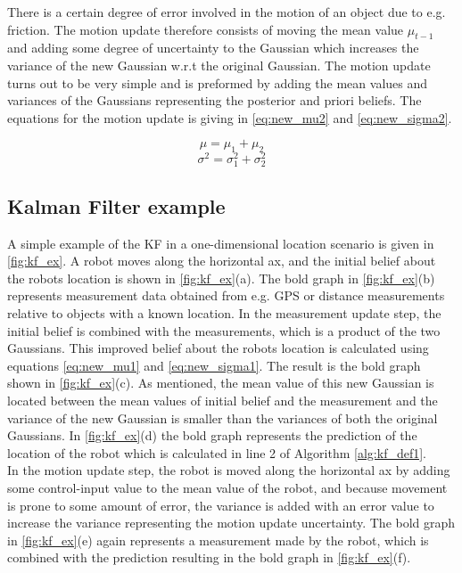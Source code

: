 There is a certain degree of error involved in the motion of an object due to e.g. friction. The motion update therefore consists of moving the mean value $\mu_{t-1}$ and adding some degree of uncertainty to the Gaussian which increases the variance of the new Gaussian w.r.t the original Gaussian. The motion update turns out to be very simple and is preformed by adding the mean values and variances of the Gaussians representing the posterior and priori beliefs. The equations for the motion update is giving in \ref{eq:new_mu2} and \ref{eq:new_sigma2}.

\begin{equation}
\label{eq:new_mu2}
\mu = \mu_{1} + \mu_{2}
\end{equation}
\begin{equation}
\label{eq:new_sigma2}
\sigma^2 = \sigma_{1}^2 + \sigma_{2}^2
\end{equation}

\subsection{Kalman Filter example}

A simple example of the KF in a one-dimensional location scenario is given in \autoref{fig:kf_ex}. A robot moves along the horizontal ax, and the initial belief about the robots location is shown in \autoref{fig:kf_ex}(a). The bold graph in \autoref{fig:kf_ex}(b) represents measurement data obtained from e.g. GPS or distance measurements relative to objects with a known location. In the measurement update step, the initial belief is combined with the measurements, which is a product of the two Gaussians. This improved belief about the robots location is calculated using equations \ref{eq:new_mu1} and \ref{eq:new_sigma1}. The result is the bold graph shown in \autoref{fig:kf_ex}(c). As mentioned, the mean value of this new Gaussian is located between the mean values of initial belief and the measurement and the variance of the new Gaussian is smaller than the variances of both the original Gaussians. In \autoref{fig:kf_ex}(d) the bold graph represents the prediction of the location of the robot which is calculated in line 2 of Algorithm \autoref{alg:kf_def1}. \\

In the motion update step, the robot is moved along the horizontal ax by adding some control-input value to the mean value of the robot, and because movement is prone to some amount of error, the variance is added with an error value to increase the variance representing the motion update uncertainty. The bold graph in \autoref{fig:kf_ex}(e) again represents a measurement made by the robot, which is combined with the prediction resulting in the bold graph in \autoref{fig:kf_ex}(f).

